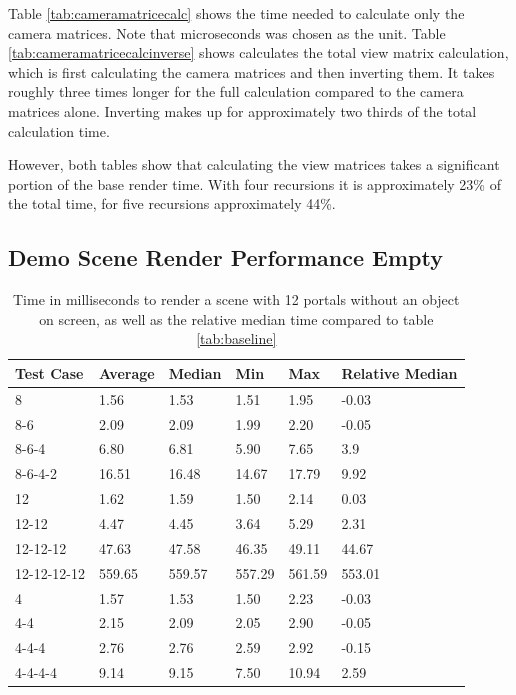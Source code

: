Table \ref{tab:cameramatricecalc} shows the time needed to calculate only the camera matrices. Note that microseconds was chosen as the unit. Table \ref{tab:cameramatricecalcinverse} shows calculates the total view matrix calculation, which is first calculating the camera matrices and then inverting them. It takes roughly three times longer for the full calculation compared to the camera matrices alone. Inverting makes up for approximately two thirds of the total calculation time.

However, both tables show that calculating the view matrices takes a significant portion of the base render time. With four recursions it is approximately 23\% of the total time, for five recursions approximately 44\%. 

\subsection{Demo Scene Render Performance Empty}


\begin{table}[H]
	\centering
	\begin{tabular}{|l|l|l|l|l|l|}
		\hline
		Test Case   & Average & Median & Min    & Max    & Relative Median \\ \hline
		8           & 1.56    & 1.53   & 1.51   & 1.95   & -0.03           \\ \hline
		8-6         & 2.09    & 2.09   & 1.99   & 2.20   & -0.05           \\ \hline
		8-6-4       & 6.80    & 6.81   & 5.90   & 7.65   & 3.9             \\ \hline
		8-6-4-2     & 16.51   & 16.48  & 14.67  & 17.79  & 9.92            \\ \hline
		12          & 1.62    & 1.59   & 1.50   & 2.14   & 0.03            \\ \hline
		12-12       & 4.47    & 4.45   & 3.64   & 5.29   & 2.31            \\ \hline
		12-12-12    & 47.63   & 47.58  & 46.35  & 49.11  & 44.67           \\ \hline
		12-12-12-12 & 559.65  & 559.57 & 557.29 & 561.59 & 553.01          \\ \hline
		4           & 1.57    & 1.53   & 1.50   & 2.23   & -0.03           \\ \hline
		4-4         & 2.15    & 2.09   & 2.05   & 2.90   & -0.05           \\ \hline
		4-4-4       & 2.76    & 2.76   & 2.59   & 2.92   & -0.15           \\ \hline
		4-4-4-4     & 9.14    & 9.15   & 7.50   & 10.94  & 2.59            \\ \hline
	\end{tabular}
	\caption{Time in milliseconds to render a scene with 12 portals without an object on screen, as well as the relative median time compared to table \ref{tab:baseline}}
	\label{tab:rendernothing}
\end{table}


